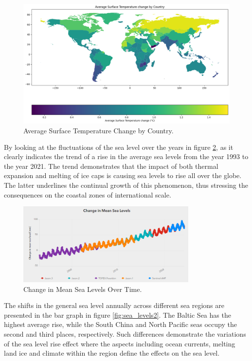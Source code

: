 \documentclass[a4paper,11pt]{article}
\begin{document}
\begin{figure}[ht!]
    \centering
    \includegraphics[width=1\textwidth]{pictures/temp_world.png}
    \caption{Average Surface Temperature Change by Country.}
    \label{fig:temp_change}
\end{figure}

By looking at the fluctuations of the sea level over the years in figure \ref{fig:sea_levels}, as it clearly indicates the trend of a rise in the average sea levels from the year 1993 to the year 2021. The trend demonstrates that the impact of both thermal expansion and melting of ice caps is causing sea levels to rise all over the globe. The latter underlines the continual growth of this phenomenon, thus stressing the consequences on the coastal zones of international scale.

\begin{figure}[h]
    \centering
    \includegraphics[width=0.8\textwidth]{pictures/sea_levels.png}
    \caption{Change in Mean Sea Levels Over Time.}
    \label{fig:sea_levels}
\end{figure}

The shifts in the general sea level annually across different sea regions are presented in the bar graph in figure \ref{fig:sea_levels2}. The Baltic Sea has the highest average rise, while the South China and North Pacific seas occupy the second and third places, respectively. Such differences demonstrate the variations of the sea level rise effect where the aspects including ocean currents, melting land ice and climate within the region define the effects on the sea level.
\end{document}
